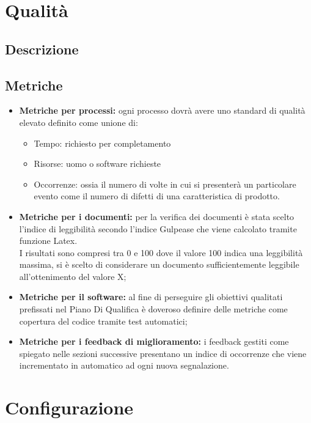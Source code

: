 \documentclass[NormeDiProgetto.tex]{subfiles}
\begin{document}
	\section{Qualità}
	\subsection{Descrizione}
	\subsection{Metriche}
	\begin{itemize}
		\item \textbf{Metriche per processi:} ogni processo dovrà avere uno standard di qualità elevato definito come unione di:
		\begin{itemize}
			\item Tempo: richiesto per completamento
			\item Risorse: uomo o software richieste
			\item Occorrenze: ossia il numero di volte in cui si presenterà un particolare evento come il numero di difetti di una caratteristica di prodotto.
		\end{itemize} 
		
		\item \textbf{Metriche per i documenti:} per la verifica dei documenti è stata scelto l'indice di leggibilità secondo l'indice Gulpease che viene calcolato tramite funzione Latex.\\I risultati sono compresi tra 0 e 100 dove il valore 100 indica una leggibilità massima, si è scelto di considerare un documento sufficientemente leggibile all'ottenimento del valore X; %
		
		\item \textbf{Metriche per il software:} al fine di perseguire gli obiettivi qualitati prefissati nel Piano Di Qualifica è doveroso definire delle metriche come copertura del codice tramite test automatici; %
		
		\item \textbf{Metriche per i feedback di miglioramento:} i feedback gestiti come spiegato nelle sezioni successive presentano un indice di occorrenze che viene incrementato in automatico ad ogni nuova segnalazione. 
	\end{itemize}

	
	\section{Configurazione}
	
\end{document}
